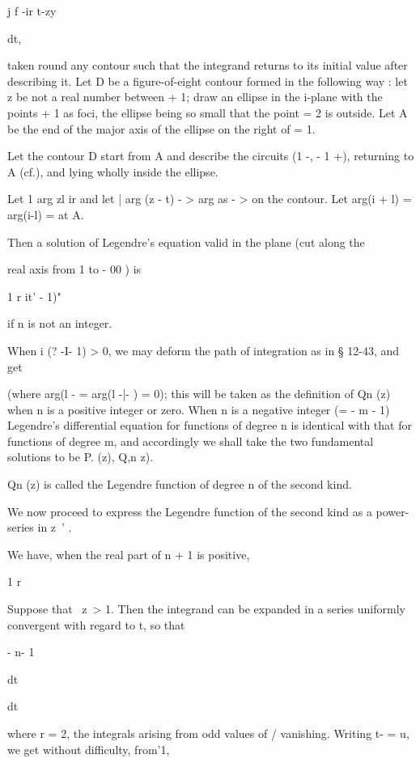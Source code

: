 {{j f -ir t-zy

dt,

taken round any contour such that the integrand returns to its initial
value after describing it. Let D be a figure-of-eight contour formed
in the following way : let z be not a real number between + 1; draw
an ellipse in the i-plane with the points + 1 as foci, the ellipse
being so small that the point = 2 is outside. Let A be the end of the
major axis of the ellipse on the right of = 1.

Let the contour D start from A and describe the circuits (1 -, - 1
+), returning to A (cf.), and lying wholly inside the ellipse.

Let 1 arg zl ir and let | arg (z - t) - > arg as - > on the contour.
Let arg(i + l) = arg(i-l) = at A.

Then a solution of Legendre's equation valid in the plane (cut along
the

real axis from 1 to - 00 ) is

1 r it' - 1)"

if n is not an integer.

When i (? -I- 1) > 0, we may deform the path of integration as in §
12-43, and get

(where arg(l - = arg(l -|- ) = 0); this will be taken as the
definition of Qn (z) when n is a positive integer or zero. When n is a
negative integer (= - m - 1) Legendre's differential equation for
functions of degree n is identical with that for functions of degree
m, and accordingly we shall take the two fundamental solutions to be
P. (z), Q,n z).

Qn (z) is called the Legendre function of degree n of the second kind.

%
%


We now proceed to express the Legendre function of the second kind as
a power-series in z~' .

We have, when the real part of n + 1 is positive,

1 r

Suppose that \ z\ > 1. Then the integrand can be expanded in a series
uniformly convergent with regard to t, so that

- n- 1

dt

dt

where r = 2, the integrals arising from odd values of / vanishing.
Writing t- = u, we get without difficulty, from'1,

}}
